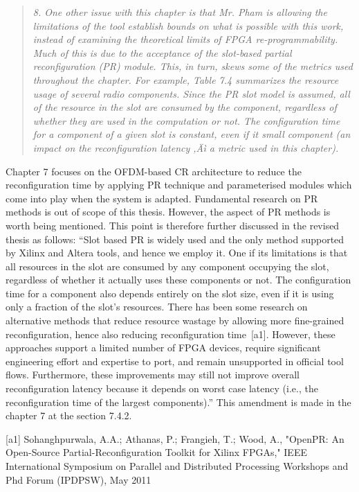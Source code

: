 \documentclass{article}
\begin{document}
\begin{quote}
\emph{8. One other issue with this chapter is that Mr. Pham is allowing the limitations of the tool establish bounds on what is possible with this work, instead of examining the theoretical limits of FPGA re-programmability. Much of this is due to the acceptance of the slot-based partial reconfiguration (PR) module. This, in turn, skews some of the metrics used throughout the chapter. For example, Table 7.4 summarizes the resource usage of several radio components. Since the PR slot model is assumed, all of the resource in the slot are consumed by the component, regardless of whether they are used in the computation or not. The configuration time for a component of a given slot is constant, even if it small component (an impact on the reconfiguration latency ‚Äì a metric used in this chapter).}
\end{quote}
Chapter 7 focuses on the OFDM-based CR architecture to reduce the reconfiguration time by applying PR technique and parameterised modules which come into play when the system is adapted. Fundamental research on PR methods is out of scope of this thesis. However, the aspect of PR methods is worth being mentioned. This point is therefore further discussed in the revised thesis as follows:
``Slot based PR is widely used and the only method supported by Xilinx and Altera tools, and hence we employ it.
One if its limitations is that all resources in the slot are consumed by any component occupying the slot, regardless of whether it actually uses these components or not. The configuration time for a component also depends entirely on the slot size, even if it is using only a fraction of the slot's resources.
There has been some research on alternative methods that reduce resource wastage by allowing more fine-grained reconfiguration, hence also reducing reconfiguration time~[a1].
However, these approaches support a limited number of FPGA devices, require significant engineering effort and expertise to port, and remain unsupported in official tool flows.
Furthermore, these improvements may still not improve overall reconfiguration latency because it depends on worst case latency (i.e., the reconfiguration time of the largest components).''
This amendment is made in the chapter 7 at the section 7.4.2.

[a1]  Sohanghpurwala, A.A.; Athanas, P.; Frangieh, T.; Wood, A., "OpenPR: An Open-Source Partial-Reconfiguration Toolkit for Xilinx FPGAs," IEEE International Symposium on Parallel and Distributed Processing Workshops and Phd Forum (IPDPSW), May 2011
\end{document}
